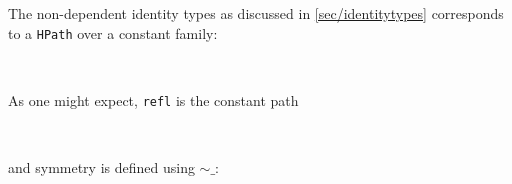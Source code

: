 The non-dependent identity types as discussed in \autoref{sec/identitytypes}
corresponds to a \texttt{HPath} over a constant family:
\begin{code}%
\>[0]\AgdaOperator{\AgdaFunction{\AgdaUnderscore{}==\AgdaUnderscore{}}}\AgdaSpace{}%
\AgdaSymbol{:}\AgdaSpace{}%
\AgdaSymbol{\{}\AgdaSpace{}%
\AgdaSymbol{:}\AgdaSpace{}%
\AgdaSymbol{\}}\AgdaSpace{}%
\AgdaSpace{}%
\AgdaSpace{}%
\AgdaSpace{}%
\AgdaSpace{}%
\AgdaSpace{}%
\<%
\\
\>[0]\AgdaOperator{\AgdaFunction{\AgdaUnderscore{}==\AgdaUnderscore{}}}\AgdaSpace{}%
\AgdaSymbol{\{}\AgdaSymbol{\}}\AgdaSpace{}%
\AgdaSpace{}%
\AgdaSpace{}%
\AgdaSymbol{=}\AgdaSpace{}%
\AgdaSpace{}%
\AgdaSpace{}%
\AgdaBound{\AgdaUnderscore{}}\AgdaSpace{}%
\AgdaSpace{}%
\AgdaSymbol{)}\AgdaSpace{}%
\AgdaSpace{}%
\<%
\end{code}
As one might expect, \texttt{refl} is the constant path
\begin{code}%
\>[0]\AgdaSpace{}%
\AgdaSymbol{:}\AgdaSpace{}%
\AgdaSymbol{\{}\AgdaSpace{}%
\AgdaSymbol{:}\AgdaSpace{}%
\AgdaSymbol{\}}\AgdaSpace{}%
\AgdaSpace{}%
\AgdaSpace{}%
\AgdaSpace{}%
\<%
\\
\>[0]\AgdaSpace{}%
\AgdaSymbol{\{}\AgdaSpace{}%
\AgdaSymbol{=}\AgdaSpace{}%
\AgdaSymbol{\}}\AgdaSpace{}%
\AgdaSymbol{=}\AgdaSpace{}%
\AgdaSpace{}%
\AgdaSpace{}%
\AgdaSpace{}%
\<%
\end{code}
and symmetry is defined using $\sim\_$:
\begin{code}%
\>[0]\AgdaSpace{}%
\AgdaSymbol{:}\AgdaSpace{}%
\AgdaSymbol{\{}\AgdaSpace{}%
\AgdaSpace{}%
\AgdaSymbol{:}\AgdaSpace{}%
\AgdaSymbol{\}}\AgdaSpace{}%
\AgdaSpace{}%
\AgdaSpace{}%
\AgdaSpace{}%
\AgdaSpace{}%
\AgdaSpace{}%
\AgdaSpace{}%
\AgdaSpace{}%
\<%
\\
\>[0]\AgdaSpace{}%
\AgdaSpace{}%
\AgdaSymbol{=}\AgdaSpace{}%
\AgdaSpace{}%
\AgdaSpace{}%
\AgdaSpace{}%
\AgdaSpace{}%
\AgdaSymbol{(}\AgdaOperator{\AgdaPrimitive{\textasciitilde{}}}\AgdaSpace{}%
\AgdaSymbol{)}\<%
\end{code}
